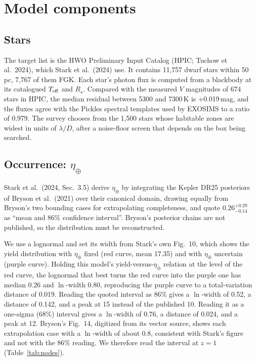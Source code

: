 \documentclass[11pt,a4paper]{article}
\begin{document}
\section{Model components}
\label{sec:nodes}

\subsection{Stars}

The target list is the HWO Preliminary Input Catalog (HPIC; Tuchow et al.\ 2024), which Stark et
al.\ (2024) use. It contains 11,757 dwarf stars within 50\,pc, 7,767 of them FGK. Each
star's photon flux is computed from a blackbody at its catalogued $T_{\rm eff}$ and $R_\star$.
Compared with the measured $V$ magnitudes of 674 stars in HPIC, the median residual between
5300 and 7300\,K is +0.019\,mag, and the fluxes agree with the Pickles spectral templates used
by EXOSIMS to a ratio of 0.979. The survey chooses from the 1,500 stars whose habitable
zones are widest in units of $\lambda/D$, after a noise-floor screen that depends on the box being
searched.

\subsection{Occurrence: $\eta_\oplus$}
\label{sec:eta}

Stark et al.\ (2024, Sec.~3.5) derive $\eta_\oplus$ by integrating the Kepler DR25 posteriors of
Bryson et al.\ (2021) over their canonical domain, drawing equally from Bryson's two bounding cases
for extrapolating completeness, and quote $0.26^{+0.29}_{-0.14}$ as ``mean and 86\% confidence
interval''. Bryson's posterior chains are not published, so the distribution must be
reconstructed.

We use a lognormal and set its width from Stark's own Fig.~10, which shows the yield distribution
with $\eta_\oplus$ fixed (red curve, mean 17.35) and with $\eta_\oplus$ uncertain (purple
curve). Holding this model's yield-versus-$\eta_\oplus$ relation at the level of the red curve,
the lognormal that best turns the red curve into the purple one has median 0.26 and
$\ln$-width 0.80, reproducing the purple curve to a total-variation distance of
0.019. Reading the quoted interval as 86\% gives a $\ln$-width of 0.52, a
distance of 0.142, and a peak at 15 instead of the published 10.
Reading it as a one-sigma (68\%) interval gives a $\ln$-width of 0.76, a distance of
0.024, and a peak at 12. Bryson's Fig.~14, digitized from its vector
source, shows each extrapolation case with a $\ln$-width of about 0.8, consistent with Stark's
figure and not with the 86\% reading. We therefore read the interval at $z = 1$
(Table~\ref{tab:nodes}).
\end{document}
